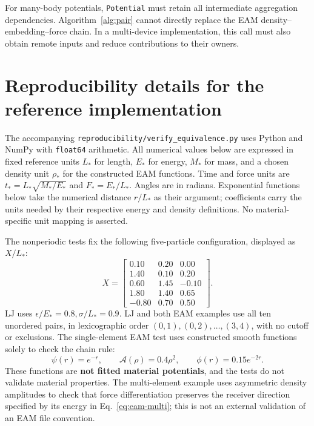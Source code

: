 \documentclass[11pt,a4paper]{article}
\theoremstyle{definition}
\begin{document}
For many-body potentials, \texttt{Potential} must retain all intermediate aggregation
dependencies. Algorithm~\ref{alg:pair} cannot directly replace the EAM density--embedding--force
chain. In a multi-device implementation, this call must also obtain remote inputs and reduce
contributions to their owners.
\section{Reproducibility details for the reference implementation}
\label{app:verification}

The accompanying \texttt{reproducibility/verify\_equivalence.py} uses Python and NumPy with
\texttt{float64} arithmetic. All numerical values below are expressed in fixed reference units
$L_*$ for length, $E_*$ for energy, $M_*$ for mass, and a chosen density unit $\rho_*$ for
the constructed EAM functions. Time and force units are
$t_*=L_*\sqrt{M_*/E_*}$ and $F_*=E_*/L_*$. Angles are in radians. Exponential functions
below take the numerical distance $r/L_*$ as their argument; coefficients carry the units
needed by their respective energy and density definitions. No material-specific unit mapping
is asserted.

The nonperiodic tests fix the following five-particle configuration, displayed as $X/L_*$:
\begin{equation}
X=\begin{bmatrix}
0.10&0.20&0.00\\
1.40&0.10&0.20\\
0.60&1.45&-0.10\\
1.80&1.40&0.65\\
-0.80&0.70&0.50
\end{bmatrix}.
\end{equation}
LJ uses $\epsilon/E_*=0.8,\sigma/L_*=0.9$. LJ and both EAM examples use all ten unordered
pairs, in lexicographic order $(0,1),(0,2),\ldots,(3,4)$, with no cutoff or exclusions.
The single-element EAM test uses constructed smooth functions
solely to check the chain rule:
\begin{equation}
\psi(r)=e^{-r},\qquad \mathcal A(\rho)=0.4\rho^2,\qquad
\phi(r)=0.15e^{-2r}.
\end{equation}
These functions are \textbf{not fitted material potentials}, and the tests do not validate
material properties. The multi-element example uses asymmetric density amplitudes to check
that force differentiation preserves the receiver direction specified by its energy in
Eq.~\eqref{eq:eam-multi}; this is not an external validation of an EAM file convention.
\end{document}

